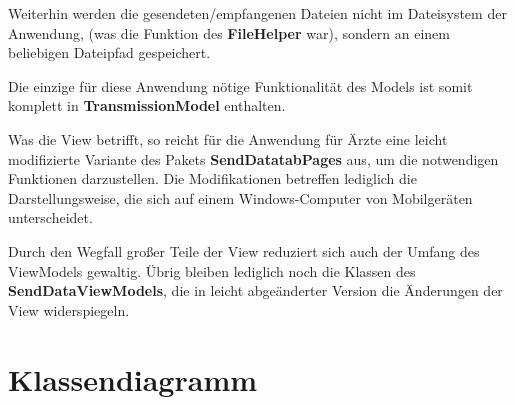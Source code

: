 \documentclass[a4paper]{scrreprt}
\begin{document}
Weiterhin werden die gesendeten/empfangenen Dateien nicht im Dateisystem der Anwendung, (was die Funktion des \textbf{FileHelper} war), sondern an einem beliebigen Dateipfad gespeichert.

Die einzige für diese Anwendung nötige Funktionalität des Models ist somit komplett in \textbf{TransmissionModel} enthalten.

Was die View betrifft, so reicht für die Anwendung für Ärzte eine leicht modifizierte Variante des Pakets \textbf{SendDatatabPages} aus, um die notwendigen Funktionen darzustellen. Die Modifikationen betreffen lediglich die Darstellungsweise, die sich auf einem Windows-Computer von Mobilgeräten unterscheidet.

Durch den Wegfall großer Teile der View reduziert sich auch der Umfang des ViewModels gewaltig. Übrig bleiben lediglich noch die Klassen des \textbf{SendDataViewModels}, die in leicht abgeänderter Version die Änderungen der View widerspiegeln.

\chapter{Klassendiagramm}


\printnoidxglossaries

\listoffigures
 
\end{document}
